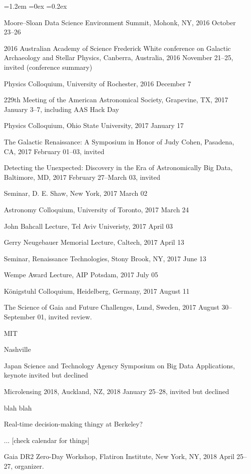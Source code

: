\documentclass[10pt,letterpaper]{article}
\newcommand{\acronym}[1]{{\small{#1}}}
\newcounter{refpubnum}
\newcommand{\hogglist}{%
    \rightmargin=0in
    \leftmargin=1.2em
    \topsep=0ex
    \partopsep=0pt
    \itemsep=0.2ex
    \parsep=0pt
    \itemindent=-1.0\leftmargin
    \listparindent=0.0\leftmargin
    \settowidth{\labelsep}{~}
    \usecounter{refpubnum}
  }
\begin{document}
\begin{list}{}{\hogglist}
{\item Moore--Sloan Data Science Environment Summit, Mohonk, NY, 2016 October 23--26
\item 2016 Australian Academy of Science Frederick White conference on Galactic Archaeology and Stellar Physics, Canberra, Australia, 2016 November 21--25, invited (conference summary)
\item Physics Colloquium, University of Rochester, 2016 December 7
\item 229th Meeting of the American Astronomical Society, Grapevine, TX, 2017 January 3--7, including AAS Hack Day
\item Physics Colloquium, Ohio State University, 2017 January 17
\item The Galactic Renaissance: A Symposium in Honor of Judy Cohen, Pasadena, CA, 2017 February 01--03, invited
\item Detecting the Unexpected: Discovery in the Era of Astronomically Big Data, Baltimore, MD, 2017 February 27--March 03, invited
\item Seminar, D. E. Shaw, New York, 2017 March 02
\item Astronomy Colloquium, University of Toronto, 2017 March 24
\item John Bahcall Lecture, Tel Aviv Univeristy, 2017 April 03
\item Gerry Neugebauer Memorial Lecture, Caltech, 2017 April 13
\item Seminar, Renaissance Technologies, Stony Brook, NY, 2017 June 13
\item Wempe Award Lecture, AIP Potsdam, 2017 July 05
\item K\"onigstuhl Colloquium, Heidelberg, Germany, 2017 August 11
\item The Science of Gaia and Future Challenges, Lund, Sweden, 2017 August 30--September 01, invited review.
\item \acronym{MIT}
\item Nashville
\item Japan Science and Technology Agency Symposium on Big Data Applications, keynote invited but declined
\item Microlensing 2018, Auckland, NZ, 2018 January 25--28, invited but declined
\item blah blah
\item Real-time decision-making thingy at Berkeley?
\item ... [check calendar for things]
\item Gaia DR2 Zero-Day Workshop, Flatiron Institute, New York, NY, 2018 April 25--27, organizer.
}
\end{list}
\end{document}
